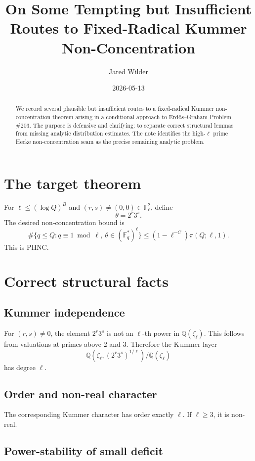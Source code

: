 \documentclass[11pt]{article}
\title{On Some Tempting but Insufficient Routes to Fixed-Radical Kummer Non-Concentration}
\author{Jared Wilder}
\date{2026-05-13}
\newcommand{\Q}{\mathbb Q}
\newcommand{\F}{\mathbb F}
\newcommand{\1}{\mathbf 1}
\begin{document}
\maketitle

\begin{abstract}
We record several plausible but insufficient routes to a fixed-radical Kummer non-concentration theorem arising in a conditional approach to Erd\H{o}s--Graham Problem \#203.  The purpose is defensive and clarifying: to separate correct structural lemmas from missing analytic distribution estimates.  The note identifies the high-\(\ell\) prime Hecke non-concentration seam as the precise remaining analytic problem.
\end{abstract}

\section{The target theorem}

For \(\ell\le(\log Q)^B\) and \((r,s)\ne(0,0)\in\F_\ell^2\), define
\[
\theta=2^r3^s.
\]
The desired non-concentration bound is
\[
\#\{q\le Q:q\equiv1\bmod\ell,\ \theta\in(\F_q^*)^\ell\}
\le
(1-\ell^{-C})\pi(Q;\ell,1).
\]
This is PHNC.

\section{Correct structural facts}

\subsection{Kummer independence}

For \((r,s)\ne0\), the element \(2^r3^s\) is not an \(\ell\)-th power in \(\Q(\zeta_\ell)\).  This follows from valuations at primes above \(2\) and \(3\).  Therefore the Kummer layer
\[
\Q(\zeta_\ell,(2^r3^s)^{1/\ell})/\Q(\zeta_\ell)
\]
has degree \(\ell\).

\subsection{Order and non-real character}

The corresponding Kummer character has order exactly \(\ell\).  If \(\ell\ge3\), it is non-real.

\subsection{Power-stability of small deficit}
\end{document}
